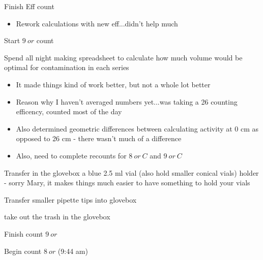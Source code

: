 \documentclass[idxtotoc,hyperref,openany,oneside]{labbook} %
\newcommand{\cmark}{\ding{51}}%
\newcommand{\done}{\rlap{$\square$}{\raisebox{2pt}{\large\hspace{1pt}\cmark}}%
  \hspace{-2.5pt}}
\begin{document}
\begin{todolist}
\item[\done]{Finish Eff count}
  \begin{itemize}
  \item{Rework calculations with new eff...didn't help much}
  \end{itemize}
\item[\done]{Start $\boxed{9\ or}$ count}
\item[\done]{Spend all night making spreadsheet to calculate
  how much volume would be optimal for contamination in
  each series}
  \begin{itemize}
  \item{It made things kind of work better, but not a whole lot better}
  \item{Reason why I haven't averaged numbers yet...was taking a
    26 counting efficency, counted most of the day}
  \item{Also determined geometric differences between calculating
    activity at 0 cm as opposed to 26 cm - there wasn't much
    of a difference}
  \item{Also, need to complete recounts for $\boxed{8\ or\ C}$ and
    $\boxed{9\ or\ C}$}
  \end{itemize}
\end{todolist}





\begin{todolist}
\item[\done]{Transfer in the glovebox a blue 2.5 ml vial
  (also hold smaller conical
  vials) holder - sorry Mary, it makes things much easier to
  have something to hold your vials}
\item[\done]{Transfer smaller pipette tips into glovebox}
\item[\done]{take out the trash in the glovebox}
\end{todolist}


\begin{todolist}
\item[\done]{Finish count $\boxed{9\ or}$}
\item[\done]{Begin count $\boxed{8\ or}$ (9:44 am)}
\end{todolist}
\end{document}
